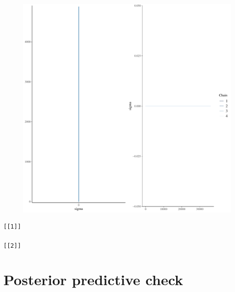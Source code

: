 \documentclass[
]{report}
\begin{document}
\begin{figure}

{\centering \includegraphics[width=1\textwidth,height=\textheight]{diagnostic_plots_files/figure-pdf/unnamed-chunk-2-2.pdf}

}

\end{figure}

\begin{verbatim}
[[1]]

[[2]]
\end{verbatim}

\hypertarget{posterior-predictive-check}{%
\section{Posterior predictive check}\label{posterior-predictive-check}}
\end{document}
